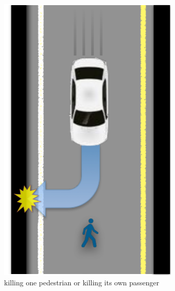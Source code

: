 \begin{figure}[!ht]
\begin{subfigure}{0.3\textwidth}
      \centering
      \includegraphics[width=\textwidth]{images/chapter10/dilemmaB.png}
      \caption{killing one pedestrian or killing its own passenger}
      \label{fig:b}
    \end{subfigure}
    \hspace{\fill}
    \begin{subfigure}{0.3\textwidth}
        \centering

\end{subfigure}
\end{figure}
